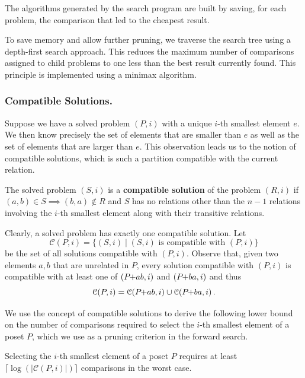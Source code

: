 \documentclass[a4paper,UKenglish,cleveref, autoref, thm-restate]{lipics-v2021}
\newcommand{\pchild}[3]{{#1}\kern-1pt{+}{#2}{#3}}
\begin{document}
The algorithms generated by the search program are built by saving, for each problem, the comparison that led to the cheapest result.

To save memory and allow further pruning, we traverse the search tree using a depth-first search approach.
This reduces the maximum number of comparisons assigned to child problems to one less than the best result currently found.
This principle is implemented using a minimax algorithm.

\subsubsection{Compatible Solutions.}
Suppose we have a solved problem $(P, i)$ with a unique $i$-th smallest element $e$.
We then know precisely the set of elements that are smaller than $e$ as well as the set of elements that are larger than $e$.
This observation leads us to the notion of compatible solutions, which is such a partition compatible with the current relation.

\begin{definition}
  The solved problem $(S, i)$ is a \textbf{compatible solution} of the problem $(R, i)$ if $(a, b) \in S \implies (b, a) \notin R$ and $S$ has no relations other than the $n - 1$ relations involving the $i$-th smallest element along with their transitive relations.
\end{definition}

Clearly, a solved problem has exactly one compatible solution.
Let
\begin{equation*}
  \mathcal{C}(P, i) = \{(S, i) \mid (S, i) \text{ is compatible with } (P, i)\}
\end{equation*}
be the set of all solutions compatible with $(P, i)$.
Observe that, given two elements $a,b$ that are unrelated in $P$, every solution compatible with $(P, i)$ is compatible with at least one of $(\pchild{P}{a}{b}, i)$ and $(\pchild{P}{b}{a}, i)$ and thus
\begin{equation}\label{lemma:compatible_union}
\mathcal{C}(P, i) = \mathcal{C}(\pchild{P}{a}{b}, i) \cup \mathcal{C}(\pchild{P}{b}{a}, i)\,\text{.}
\end{equation}

We use the concept of compatible solutions to derive the following lower bound on the number of comparisons required to select the $i$-th smallest element of a poset $P$, which we use as a pruning criterion in the forward search.

\begin{theorem}\label{theorem:compatible_log}
Selecting the $i$-th smallest element of a poset $P$ requires at least $\lceil\log(|\mathcal{C}(P, i)|)\rceil$ comparisons in the worst case.
\end{theorem}
\end{document}
